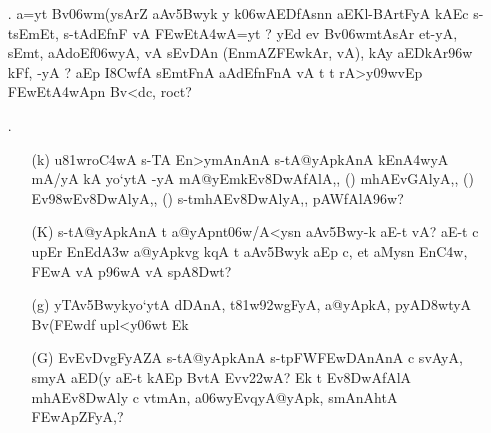 \begin{itemize}
 \item[{\dn \dnnum \rn{29}}.] {\dn a=y\?t Bv\306wm(ysAr\?Z aAv\35Bwyk y k\?\306wAEDfAsn\?n aEKl{\rs -\re}BArtFyA kAEc s\2-tsEmEt, s\2-tAd\?EfnF vA \3FEwEt\3A4wA=y\?t {\rs ?\re} yEd ev Bv\306wmtAsAr et-yA, sEmt\?, aAdoEf\306wyA, vA s\2EvDAn\2 {\rs (\re}EnmA\0Z\3FEwkAr, vA{\rs ),\re} kAy\0 aEDkAr\396w kFf, -yA {\rs ?\re} aEp I\38CwfA\2 sEmtFnA aAd\?EfnFnA\2 vA t\? t\? rA>y\?\309wvEp \3FEwEt\3A4wApn\2 Bv<dc, roc\?t{\rs ?\re}}
 
 \item[{\dn \dnnum \rn{30}}.] \begin{itemize}
                 
                 \item[({\dn k})] {\dn u\381wro\3C4wA s\2-TA En>ymAnAnA\2 s\2-tA@yApkAnA\2 kEn\3A4wyA mA/yA kA yo`ytA -yA mA@yEmk\-Ev\38DwAfAlA,{\rs ,\re} {\rs (\re}{\dn \dnnum {}}{\rs )\re} mhAEvGAlyA,{\rs ,\re} {\rs (\re}{\dn \dnnum {}}{\rs )\re} Ev\398w\-Ev\38DwA\-lyA,{\rs ,\re} {\rs (\re}{\dn\dnnum {}}{\rs )\re} s\2-tmhAEv\38DwAlyA,{\rs ,\re} pAWfAlA\396w{\rs ?\re}}
                 
                 \item[({\dn K})] {\dn s\2-tA@yApkAnA\2 t\? a@yApnt\306w/A<ysn aAv\35Bwy{\rs -\re}\-k aE-t vA{\rs ?\re} aE-t c\? upEr EnEd\3A3w\? a@yApkvg\?{\qvb} k\?qA\2 t aAv\35Bwyk aEp c{\rs ,\re} et aMysn\2 En\3C4w\?, \3FEwA vA p\396wA vA s\2pA\38Dw\?t{\rs ?\re}} 
                 
                 \item[({\dn g})] {\dn yTAv\35Bwykyo`ytA\2 dDAnA, t\381w\392wgF{\qvb}yA, a@yApkA, pyA\0\3D8wtyA Bv(\3FEwd\?f\? upl<y\306wt\? Ek}
                 
                 \item[({\dn G})] {\dn EvEvDvgF{\qvb}yAZA\2 s\2-tA@yApkAnA\2 s\2-tpFW\3FEwDAnAnA\2 c s\?vAyA, smyA aED(y aE-t kAEp BvtA\2 Evv\322wA{\rs ?\re} Ek\2  t\? Ev\38DwAfAlA mhAEv\38DwAly\? c vt\0mAn\4, a\306wyEvqyA@yApk\4, smAnAh\0tA\2 \3FEwApZFyA,{\rs ?\re}}  
                 \end{itemize}
\end{itemize}

